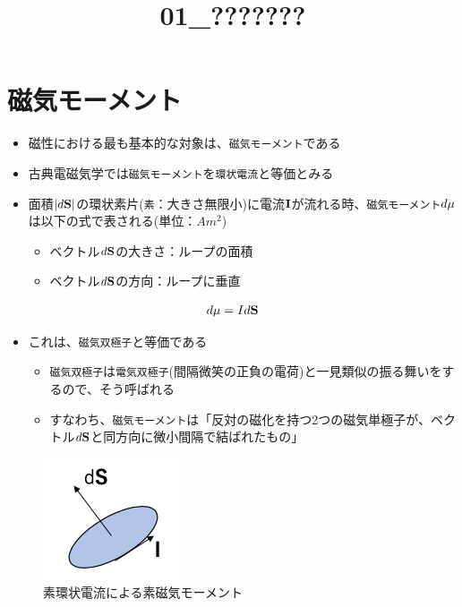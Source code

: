 \documentclass[11pt]{article}
\title{01\_???????}
\makeatletter
\def\maxwidth{\ifdim\Gin@nat@width>\linewidth\linewidth
    \else\Gin@nat@width\fi}
\let\Oldincludegraphics\includegraphics
\renewcommand{\includegraphics}[1]{\Oldincludegraphics[width=.8\maxwidth]{#1}}
\makeatother
\begin{document}
    
    
    \maketitle
    
    

    
    \section{磁気モーメント}\label{ux78c1ux6c17ux30e2ux30fcux30e1ux30f3ux30c8}

\begin{itemize}
\item
  磁性における最も基本的な対象は、\texttt{磁気モーメント}である
\item
  古典電磁気学では\texttt{磁気モーメント}を\texttt{環状電流}と等価とみる
\item
  面積\(|d{\bf S}|\)の環状素片(\texttt{素}：大きさ無限小)に電流\({\bf I}\)が流れる時、\texttt{磁気モーメント}\(d{\bf \mu}\)は以下の式で表される(単位：\(Am^2\))

  \begin{itemize}
  \item
    ベクトル\(d{\bf S}\)の大きさ：ループの面積
  \item
    ベクトル\(d{\bf S}\)の方向：ループに垂直
  \end{itemize}
\end{itemize}

\begin{eqnarray}
d{\bf \mu}=Id{\bf S}
\end{eqnarray}

\begin{itemize}
\item
  これは、\texttt{磁気双極子}と等価である

  \begin{itemize}
  \item
    \texttt{磁気双極子}は\texttt{電気双極子}(間隔微笑の正負の電荷)と一見類似の振る舞いをするので、そう呼ばれる
  \item
    すなわち、\texttt{磁気モーメント}は「反対の磁化を持つ2つの磁気単極子が、ベクトル\(d{\bf S}\)と同方向に微小間隔で結ばれたもの」
  \end{itemize}
\end{itemize}

\begin{figure}
\centering
\includegraphics{./images/素環状電流による素磁気モーメント.png}
\caption{素環状電流による素磁気モーメント}
\end{figure}
\end{document}
